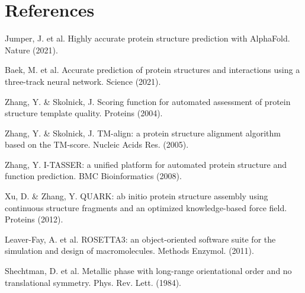 \section{References}

Jumper, J. et al. Highly accurate protein structure prediction with AlphaFold. Nature (2021).

Baek, M. et al. Accurate prediction of protein structures and interactions using a three-track neural network. Science (2021).

Zhang, Y. \& Skolnick, J. Scoring function for automated assessment of protein structure template quality. Proteins (2004).

Zhang, Y. \& Skolnick, J. TM-align: a protein structure alignment algorithm based on the TM-score. Nucleic Acids Res. (2005).

Zhang, Y. I-TASSER: a unified platform for automated protein structure and function prediction. BMC Bioinformatics (2008).

Xu, D. \& Zhang, Y. QUARK: ab initio protein structure assembly using continuous structure fragments and an optimized knowledge-based force field. Proteins (2012).

Leaver-Fay, A. et al. ROSETTA3: an object-oriented software suite for the simulation and design of macromolecules. Methods Enzymol. (2011).

Shechtman, D. et al. Metallic phase with long-range orientational order and no translational symmetry. Phys. Rev. Lett. (1984).
